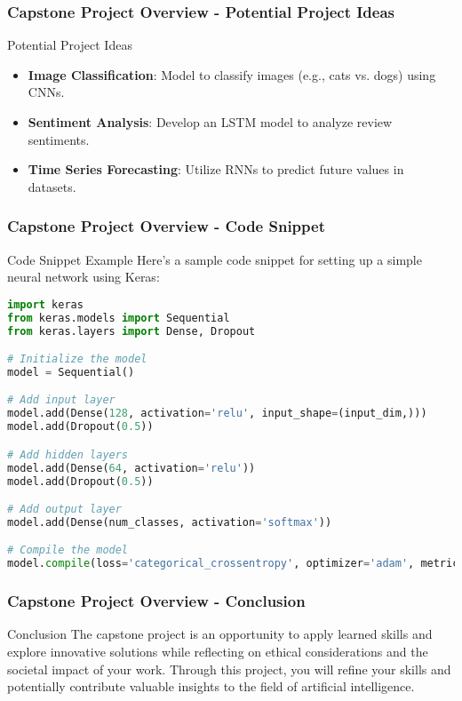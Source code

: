 \documentclass[aspectratio=169]{beamer}
\begin{document}
\begin{frame}[fragile]
    \frametitle{Capstone Project Overview - Potential Project Ideas}
    \begin{block}{Potential Project Ideas}
        \begin{itemize}
            \item \textbf{Image Classification}: Model to classify images (e.g., cats vs. dogs) using CNNs.
            \item \textbf{Sentiment Analysis}: Develop an LSTM model to analyze review sentiments.
            \item \textbf{Time Series Forecasting}: Utilize RNNs to predict future values in datasets.
        \end{itemize}
    \end{block}
\end{frame}

\begin{frame}[fragile]
    \frametitle{Capstone Project Overview - Code Snippet}
    \begin{block}{Code Snippet Example}
        Here’s a sample code snippet for setting up a simple neural network using Keras:
        \begin{lstlisting}[language=Python]
import keras
from keras.models import Sequential
from keras.layers import Dense, Dropout

# Initialize the model
model = Sequential()

# Add input layer
model.add(Dense(128, activation='relu', input_shape=(input_dim,)))
model.add(Dropout(0.5))

# Add hidden layers
model.add(Dense(64, activation='relu'))
model.add(Dropout(0.5))

# Add output layer
model.add(Dense(num_classes, activation='softmax'))

# Compile the model
model.compile(loss='categorical_crossentropy', optimizer='adam', metrics=['accuracy'])
        \end{lstlisting}
    \end{block}
\end{frame}

\begin{frame}[fragile]
    \frametitle{Capstone Project Overview - Conclusion}
    \begin{block}{Conclusion}
        The capstone project is an opportunity to apply learned skills and explore innovative solutions 
        while reflecting on ethical considerations and the societal impact of your work. 
        Through this project, you will refine your skills and potentially contribute valuable insights 
        to the field of artificial intelligence.
    \end{block}
\end{frame}
\end{document}
